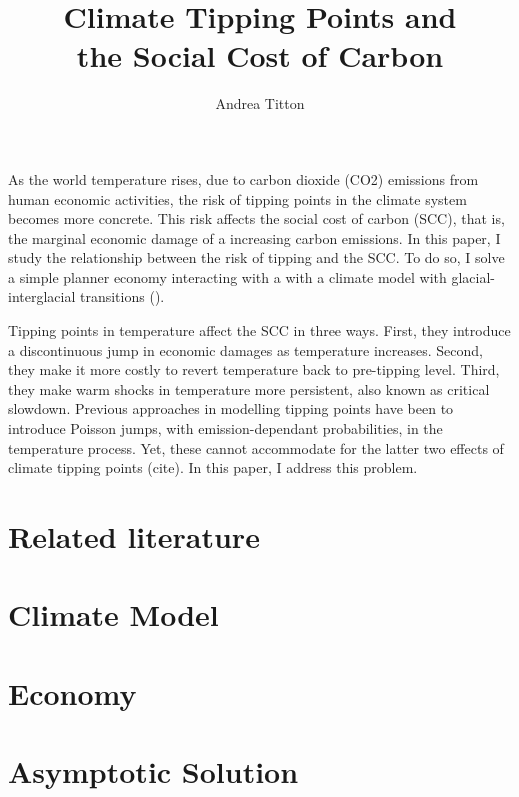 \documentclass[american, abstract=on]{scrartcl}
\author{Andrea Titton}
\title{Climate Tipping Points and\\the Social Cost of Carbon}
\begin{document}
\maketitle

As the world temperature rises, due to carbon dioxide (CO2) emissions from human economic activities, the risk of tipping points in the climate system becomes more concrete. This risk affects the social cost of carbon (SCC), that is, the marginal economic damage of a increasing carbon emissions. In this paper, I study the relationship between the risk of tipping and the SCC. To do so, I solve a simple planner economy interacting with a with a climate model
with glacial-interglacial transitions (\cite{sellers_global_1969,mcgehee_quadratic_2014}). 


Tipping points in temperature affect the SCC in three ways. First, they introduce a discontinuous jump in economic damages as temperature increases. Second, they make it more costly to revert temperature back to pre-tipping level. Third, they make warm shocks in temperature more persistent, also known as critical slowdown. Previous approaches in modelling tipping points have been to introduce Poisson jumps, with emission-dependant probabilities, in the temperature process. Yet, these cannot accommodate for the latter two effects of climate tipping points (cite). In this paper, I address this problem.




\section{Related literature}
\section{Climate Model}



\section{Economy}



\section{Asymptotic Solution}



\nocite{*}
\newpage
\printbibliography

\appendix

\end{document}
